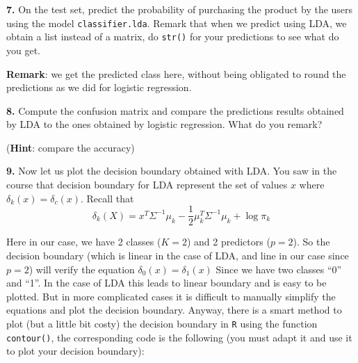 \documentclass[]{book}
\newenvironment{Shaded}{\begin{snugshade}}{\end{snugshade}}
\newcommand{\OperatorTok}[1]{\textcolor[rgb]{0.81,0.36,0.00}{\textbf{#1}}}
\newcommand{\NormalTok}[1]{#1}
\begin{document}
\begin{Shaded}
\end{Shaded}

\textbf{7.} On the test set, predict the probability of purchasing the
product by the users using the model \texttt{classifier.lda}. Remark
that when we predict using LDA, we obtain a list instead of a matrix, do
\texttt{str()} for your predictions to see what do you get.

\textbf{Remark}: we get the predicted class here, without being
obligated to round the predictions as we did for logistic regression.

\textbf{8.} Compute the confusion matrix and compare the predictions
results obtained by LDA to the ones obtained by logistic regression.
What do you remark?

(\textbf{Hint}: compare the accuracy)

\textbf{9.} Now let us plot the decision boundary obtained with LDA. You
saw in the course that decision boundary for LDA represent the set of
values \(x\) where \(\delta_k(x) = \delta_c(x)\). Recall that
\[ \delta_k(X) = x^T \Sigma^{-1} \mu_k - \frac{1}{2} \mu_k^T \Sigma^{-1}  \mu_k + \log \pi_k \]

Here in our case, we have 2 classes (\(K=2\)) and 2 predictors
(\(p=2\)). So the decision boundary (which is linear in the case of LDA,
and line in our case since \(p=2\)) will verify the equation
\(\delta_0(x) = \delta_1(x)\) Since we have two classes ``0'' and ``1''.
In the case of LDA this leads to linear boundary and is easy to be
plotted. But in more complicated cases it is difficult to manually
simplify the equations and plot the decision boundary. Anyway, there is
a smart method to plot (but a little bit costy) the decision boundary in
\texttt{R} using the function \texttt{contour()}, the corresponding code
is the following (you must adapt it and use it to plot your decision
boundary):
\end{document}

